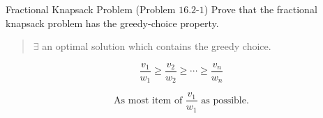
\begin{frame}{}
  \begin{exampleblock}{Fractional Knapsack Problem (Problem $16.2$-$1$)}
    Prove that the fractional knapsack problem has the greedy-choice property.
  \end{exampleblock}


  \pause
  \begin{quote}
    \centering
    {$\exists$ an optimal solution which contains the greedy choice.}
  \end{quote}

  \pause
  \[
    \frac{v_1}{w_1} \ge \frac{v_2}{w_2} \ge \cdots \ge \frac{v_n}{w_n}
  \]

  \pause
  \[
    \text{As most item of } \frac{v_1}{w_1} \text{ as possible}.
  \]
\end{frame}
